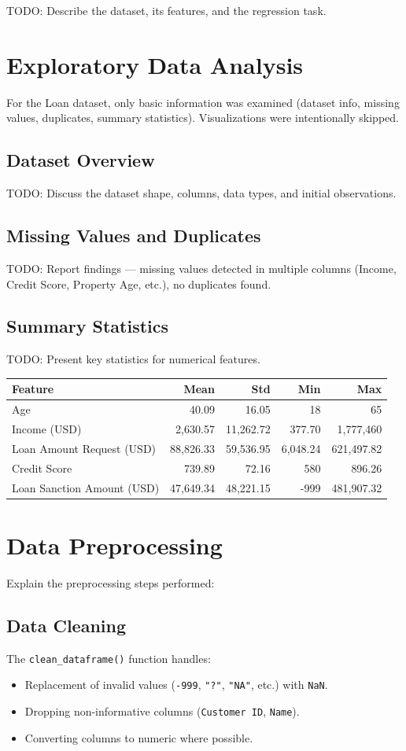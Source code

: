 \documentclass[12pt,a4paper]{article}
\begin{document}
TODO: Describe the dataset, its features, and the regression task.

\section{Exploratory Data Analysis}
For the Loan dataset, only basic information was examined (dataset info, missing values, duplicates, summary statistics). Visualizations were intentionally skipped.

\subsection{Dataset Overview}
TODO: Discuss the dataset shape, columns, data types, and initial observations.

\subsection{Missing Values and Duplicates}
TODO: Report findings — missing values detected in multiple columns (Income, Credit Score, Property Age, etc.), no duplicates found.

\subsection{Summary Statistics}
TODO: Present key statistics for numerical features.

\begin{longtable}{|l|r|r|r|r|}
\hline
\textbf{Feature} & \textbf{Mean} & \textbf{Std} & \textbf{Min} & \textbf{Max} \\ \hline
Age & 40.09 & 16.05 & 18 & 65 \\ \hline
Income (USD) & 2,630.57 & 11,262.72 & 377.70 & 1,777,460 \\ \hline
Loan Amount Request (USD) & 88,826.33 & 59,536.95 & 6,048.24 & 621,497.82 \\ \hline
Credit Score & 739.89 & 72.16 & 580 & 896.26 \\ \hline
Loan Sanction Amount (USD) & 47,649.34 & 48,221.15 & -999 & 481,907.32 \\ \hline
\end{longtable}

\section{Data Preprocessing}
Explain the preprocessing steps performed:

\subsection{Data Cleaning}
The \texttt{clean\_dataframe()} function handles:
\begin{itemize}
    \item Replacement of invalid values (\texttt{-999}, \texttt{"?"}, \texttt{"NA"}, etc.) with \texttt{NaN}.
    \item Dropping non-informative columns (\texttt{Customer ID}, \texttt{Name}).
    \item Converting columns to numeric where possible.
\end{itemize}
\end{document}
